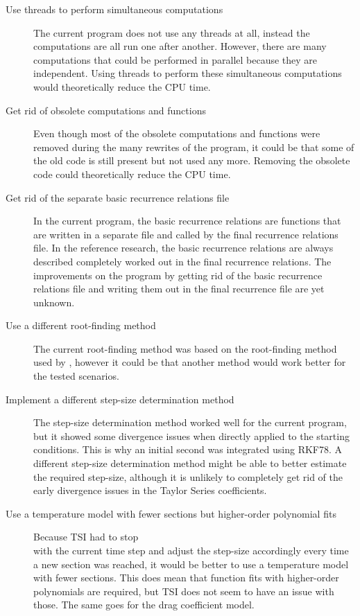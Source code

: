 \begin{description}
\item[Use threads to perform simultaneous computations]The current program does not use any threads at all, instead the computations are all run one after another. However, there are many computations that could be performed in parallel because they are independent. Using threads to perform these simultaneous computations would theoretically reduce the CPU time.
\item[Get rid of obsolete computations and functions] Even though most of the obsolete computations and functions were removed during the many rewrites of the program, it could be that some of the old code is still present but not used any more. Removing the obsolete code could theoretically reduce the CPU time.
\item[Get rid of the separate basic recurrence relations file] In the current program, the basic recurrence relations are functions that are written in a separate file and called by the final recurrence relations file. In the reference research, the basic recurrence relations are always described completely worked out in the final recurrence relations. The improvements on the program by getting rid of the basic recurrence relations file and writing them out in the final recurrence file are yet unknown.
\item[Use a different root-finding method] The current root-finding method was based on the root-finding method used by \cite{bergsma2016application}, however it could be that another method would work better for the tested scenarios. 
\item[Implement a different step-size determination method] The step-size determination method worked well for the current program, but it showed some divergence issues when directly applied to the starting conditions. This is why an initial second was integrated using \ac{RKF78}. A different step-size determination method might be able to better estimate the required step-size, although it is unlikely to completely get rid of the early divergence issues in the Taylor Series coefficients.
\item[Use a temperature model with fewer sections but higher-order polynomial fits] Because \ac{TSI} had to stop \\
with the current time step and adjust the step-size accordingly every time a new section was reached, it would be better to use a temperature model with fewer sections. This does mean that function fits with higher-order polynomials are required, but \ac{TSI} does not seem to have an issue with those. The same goes for the drag coefficient model.

\end{description}
